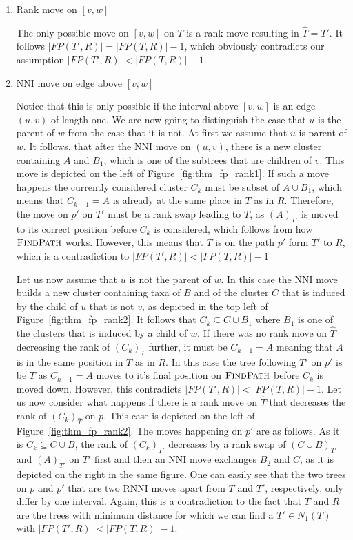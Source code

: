 \documentclass{amsart}
\newcommand{\rnni}{\mathrm{RNNI}}
\newcommand{\findpath}{\textsc{FindPath}}
\newcommand{\nni}{\mathrm{NNI}}
\begin{document}
\begin{enumerate}
    \item Rank move on $[v,w]$

    The only possible move on $[v,w]$ on $T$ is a rank move resulting in $\hat T = T'$.
    It follows $|FP(T',R)| = |FP(T,R)| - 1$, which obviously contradicts our assumption $|FP(T',R)| < |FP(T,R)| - 1$.

    \item $\nni$ move on edge above $[v,w]$

    Notice that this is only possible if the interval above $[v,w]$ is an edge $(u,v)$ of length one.
    We are now going to distinguish the case that $u$ is the parent of $w$ from the case that it is not.
    At first we assume that $u$ is parent of $w$.
    It follows, that after the $\nni$ move on $(u,v)$, there is a new cluster containing $A$ and $B_1$, which is one of the subtrees that are children of $v$.
    This move is depicted on the left of Figure~\ref{fig:thm_fp_rank1}.
    If such a move happens the currently considered cluster $C_k$ must be subset of $A \cup B_1$, which means that $C_{k-1} = A$ is already at the same place in $T$ as in $R$.
    Therefore, the move on $p'$ on $T'$ must be a rank swap leading to $T$, as $(A)_{T'}$ is moved to its correct position before $C_k$ is considered, which follows from how $\findpath$ works.
    However, this means that $T$ is on the path $p'$ form $T'$ to $R$, which is a contradiction to $|FP(T',R)| < |FP(T,R)| - 1$

    Let us now assume that $u$ is not the parent of $w$.
    In this case the $\nni$ move builds a new cluster containing taxa of $B$ and of the cluster $C$ that is induced by the child of $u$ that is not $v$, as depicted in the top left of Figure~\ref{fig:thm_fp_rank2}.
    It follows that $C_k \subseteq C \cup B_1$ where $B_1$ is one of the clusters that is induced by a child of $w$.
    If there was no rank move on $\hat T$ decreasing the rank of $(C_k)_{\hat T}$ further, it must be $C_{k-1} = A$ meaning that $A$ is in the same position in $T$ as in $R$.
    In this case the tree following $T'$ on $p'$ is be $T$ as $C_{k-1} = A$ moves to it's final position on $\findpath$ before $C_k$ is moved down.
    However, this contradicts $|FP(T',R)| < |FP(T,R)| - 1$.
    Let us now consider what happens if there is a rank move on $\hat T$ that decreases the rank of $(C_k)_{\hat T}$ on $p$.
    This case is depicted on the left of Figure~\ref{fig:thm_fp_rank2}.
    The moves happening on $p'$ are as follows.
    As it is $C_k \subseteq C \cup B$, the rank of $(C_k)_{T'}$ decreases by a rank swap of $(C \cup B)_{T'}$ and $(A)_{T'}$ on $T'$ first and then an $\nni$ move exchanges $B_2$ and $C$, as it is depicted on the right in the same figure.
    One can easily see that the two trees on $p$ and $p'$ that are two $\rnni$ moves apart from $T$ and $T'$, respectively, only differ by one interval.
    Again, this is a contradiction to the fact that $T$ and $R$ are the trees with minimum distance for which we can find a $T' \in N_1(T)$ with $|FP(T',R)| < |FP(T,R)| - 1$.


\end{enumerate}
\end{document}
